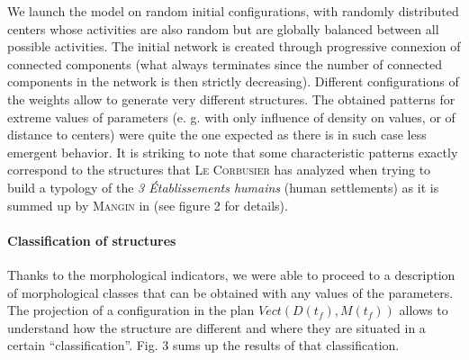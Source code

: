 \documentclass[a4paper,twocolumn,twoside,10pt]{article}
\newcommand{\noun}[1]{\textsc{#1}}
\begin{document}
We launch the model on random initial configurations, with randomly
distributed centers whose activities are also random but are globally
balanced between all possible activities. The initial network is created
through progressive connexion of connected components (what always
terminates since the number of connected components in the network
is then strictly decreasing). Different configurations of the weights
allow to generate very different structures. The obtained patterns
for extreme values of parameters (e. g. with only influence of density
on values, or of distance to centers) were quite the one expected
as there is in such case less emergent behavior. It is striking to
note that some characteristic patterns exactly correspond to the structures
that \noun{Le Corbusier} has analyzed when trying to build a typology
of the \textit{3 \'Etablissements humains}\textit{\small{} }(human settlements)
as it is summed up by \noun{Mangin} in \cite{mangin2004ville} (see
figure 2 for details).


\paragraph{Classification of structures}

Thanks to the morphological indicators, we were able to proceed to
a description of morphological classes that can be obtained with any
values of the parameters. The projection of a configuration in the
plan $Vect(D(t_{f}),M(t_{f}))$ allows to understand how the structure
are different and where they are situated in a certain ``classification''.
Fig. 3 sums up the results of that classification.
\end{document}
